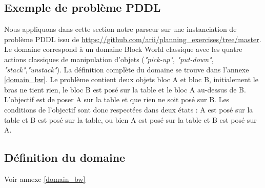 
\subsection{Exemple de problème PDDL}\label{ex_pddl}

Nous appliquons dans cette section notre parseur sur une instanciation de problème PDDL issu de \url{https://github.com/arii/planning_exercises/tree/master}. Le domaine correspond à un domaine Block World classique avec les quatre actions classiques de manipulation d'objets (\textit{"pick-up"}, \textit{"put-down"}, \textit{"stack"},\textit{"unstack"}). La définition complète du domaine se trouve dans l'annexe \ref{domain_bw}. Le problème contient deux objets bloc A et bloc B, initialement le bras ne tient rien, le bloc B est posé sur la table et le bloc A au-dessus de B. L'objectif est de poser A sur la table et que rien ne soit posé sur B. Les conditions de l'objectif sont donc respectées dans deux états : A est posé sur la table et B est posé sur la table, ou bien A est posé sur la table et B est posé sur A.

\subsection*{Définition du  domaine}

Voir annexe \ref{domain_bw}




